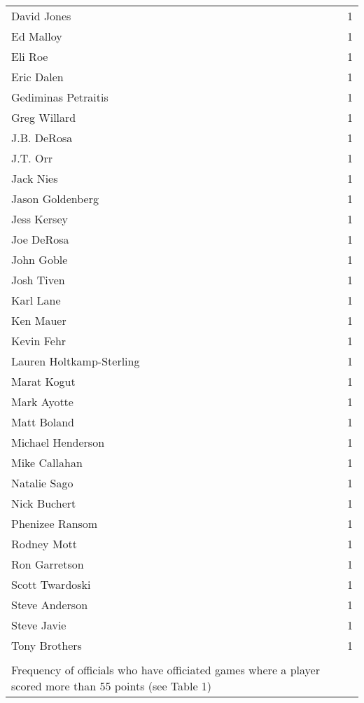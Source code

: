 \begin{longtable}{lr}
  David Jones &   1 \\ 
  Ed Malloy &   1 \\ 
  Eli Roe &   1 \\ 
  Eric Dalen &   1 \\ 
  Gediminas Petraitis &   1 \\ 
  Greg Willard &   1 \\ 
  J.B. DeRosa &   1 \\ 
  J.T. Orr &   1 \\ 
  Jack Nies &   1 \\ 
  Jason Goldenberg &   1 \\ 
  Jess Kersey &   1 \\ 
  Joe DeRosa &   1 \\ 
  John Goble &   1 \\ 
  Josh Tiven &   1 \\ 
  Karl Lane &   1 \\ 
  Ken Mauer &   1 \\ 
  Kevin Fehr &   1 \\ 
  Lauren Holtkamp-Sterling &   1 \\ 
  Marat Kogut &   1 \\ 
  Mark Ayotte &   1 \\ 
  Matt Boland &   1 \\ 
  Michael Henderson &   1 \\ 
  Mike Callahan &   1 \\ 
  Natalie Sago &   1 \\ 
  Nick Buchert &   1 \\ 
  Phenizee Ransom &   1 \\ 
  Rodney Mott &   1 \\ 
  Ron Garretson &   1 \\ 
  Scott Twardoski &   1 \\ 
  Steve Anderson &   1 \\ 
  Steve Javie &   1 \\ 
  Tony Brothers &   1 \\ 
   \hline
\hline
\caption{{ }\\Frequency of officials who have officiated games where a player scored more than 55 points (see Table 1)} 
\end{longtable}
\endgroup

